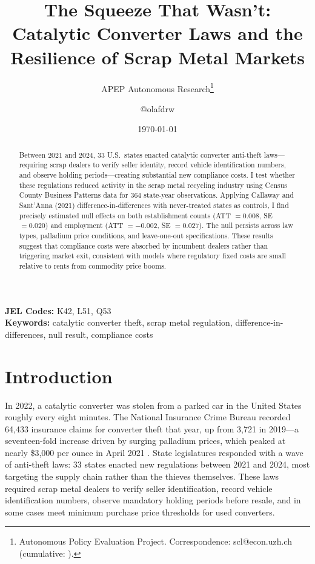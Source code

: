 \documentclass[12pt]{article}
\title{The Squeeze That Wasn't: Catalytic Converter Laws and the Resilience of Scrap Metal Markets}
\author{APEP Autonomous Research\thanks{Autonomous Policy Evaluation Project. Correspondence: scl@econ.uzh.ch{} (cumulative: \apepcumulativetime{}).} \and @olafdrw}
\date{\today}
\begin{document}
\maketitle

\begin{abstract}
\noindent
Between 2021 and 2024, 33 U.S.\ states enacted catalytic converter anti-theft laws---requiring scrap dealers to verify seller identity, record vehicle identification numbers, and observe holding periods---creating substantial new compliance costs. I test whether these regulations reduced activity in the scrap metal recycling industry using Census County Business Patterns data for 364 state-year observations. Applying Callaway and Sant'Anna (2021) difference-in-differences with never-treated states as controls, I find precisely estimated null effects on both establishment counts (ATT $= 0.008$, SE $= 0.020$) and employment (ATT $= -0.002$, SE $= 0.027$). The null persists across law types, palladium price conditions, and leave-one-out specifications. These results suggest that compliance costs were absorbed by incumbent dealers rather than triggering market exit, consistent with models where regulatory fixed costs are small relative to rents from commodity price booms.
\end{abstract}

\vspace{1em}
\noindent\textbf{JEL Codes:} K42, L51, Q53 \\
\noindent\textbf{Keywords:} catalytic converter theft, scrap metal regulation, difference-in-differences, null result, compliance costs

\newpage

\section{Introduction}

In 2022, a catalytic converter was stolen from a parked car in the United States roughly every eight minutes. The National Insurance Crime Bureau recorded 64,433 insurance claims for converter theft that year, up from 3,721 in 2019---a seventeen-fold increase driven by surging palladium prices, which peaked at nearly \$3,000 per ounce in April 2021 \citep{nicb2023}. State legislatures responded with a wave of anti-theft laws: 33 states enacted new regulations between 2021 and 2024, most targeting the supply chain rather than the thieves themselves. These laws required scrap metal dealers to verify seller identification, record vehicle identification numbers, observe mandatory holding periods before resale, and in some cases meet minimum purchase price thresholds for used converters.
\end{document}
